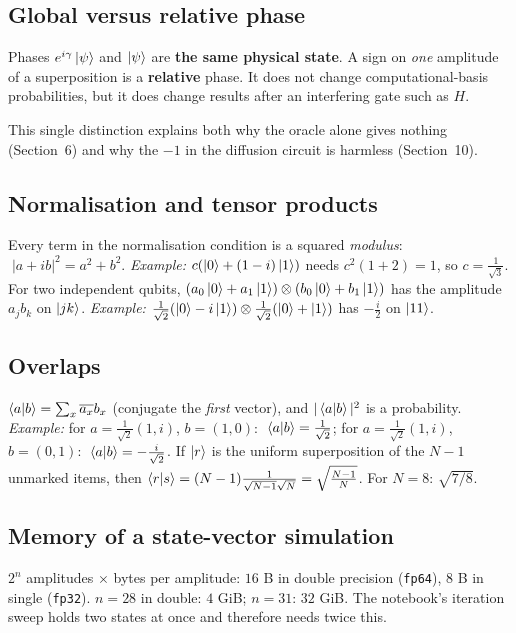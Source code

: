 \documentclass[11pt,a4paper,openany]{book}
\begin{document}
\subsection{Global versus relative phase}
\begin{keyres}{Phases}
$e^{i\gamma}\ket\psi$ and $\ket\psi$ are \textbf{the same physical state}. A sign on \emph{one} amplitude of a superposition is a \textbf{relative} phase. It does not change computational-basis probabilities, but it does change results after an interfering gate such as $H$.
\end{keyres}
This single distinction explains both why the oracle alone gives nothing (Section~6) and why the $-1$ in the diffusion circuit is harmless (Section~10).

\subsection{Normalisation and tensor products}
Every term in the normalisation condition is a squared \emph{modulus}: $\;|a + ib|^2 = a^2 + b^2$. \emph{Example:} $c(\ket0 + (1 - i)\ket1)$ needs $c^2(1 + 2) = 1$, so $c = \frac{1}{\sqrt3}$.
For two independent qubits, $(a_0\ket0 + a_1\ket1)\otimes(b_0\ket0 + b_1\ket1)$ has the amplitude $a_jb_k$ on $\ket{jk}$. \emph{Example:} $\frac{1}{\sqrt2}(\ket0 - i\ket1)\otimes\frac{1}{\sqrt2}(\ket0 + \ket1)$ has $-\frac i2$ on $\ket{11}$.

\subsection{Overlaps}
$\braket{a|b} = \sum_x\overline{a_x}b_x$ (conjugate the \emph{first} vector), and $|\braket{a|b}|^2$ is a probability. \emph{Example:} for $a = \frac{1}{\sqrt2}(1, i)$, $b = (1, 0)$: $\;\braket{a|b} = \frac{1}{\sqrt2}$; for $a = \frac{1}{\sqrt2}(1, i)$, $b = (0, 1)$: $\;\braket{a|b} = -\frac{i}{\sqrt2}$. If $\ket{r}$ is the uniform superposition of the $N - 1$ unmarked items, then
$\braket{r|s} = (N - 1)\frac{1}{\sqrt{N-1}\sqrt N} = \sqrt{\frac{N-1}{N}}$. For $N = 8$: $\sqrt{7/8}$.

\subsection{Memory of a state-vector simulation}
$2^n$ amplitudes $\times$ bytes per amplitude: $16$ B in double precision (\texttt{fp64}), $8$ B in single (\texttt{fp32}). $n = 28$ in double: $4$ GiB; $n = 31$: $32$ GiB. The notebook's iteration sweep holds two states at once and therefore needs twice this.
\end{document}
